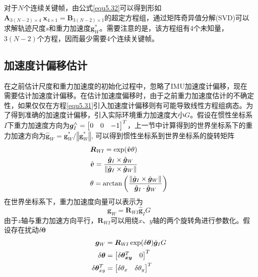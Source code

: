 对于$N$个连续关键帧，由公式\eqref{equ5.32}可以得到形如$\boldsymbol{A}_{3(N-2)\times4} \  \boldsymbol{x}_{4\times 1} = \boldsymbol{B}_{3(N-2)\times 1}$的超定方程组，通过矩阵奇异值分解(SVD)可以求解轨迹尺度$s$和重力加速度$\boldsymbol{g}_W^*$。需要注意的是，该方程组有4个未知量，$3(N-2)$个方程，因而最少需要4个连续关键帧。


\subsection{加速度计偏移估计}
在之前估计尺度和重力加速度的初始化过程中，忽略了IMU加速度计偏移，现在需要估计加速度计偏移。在估计加速度偏移时，由于之前重力加速度估计的不确定性，如果仅仅在方程\eqref{equ5.31}引入加速度计偏移则有可能导致线性方程组病态。为了得到准确的加速度计偏移，引入实际环境重力加速度大小$G$。假设在惯性坐标系$I$下重力加速度方向为$\boldsymbol{g}_I^{\wedge}= { \begin{bmatrix} 0 & 0 & -1 \cr  \end{bmatrix} ^T }$，上一节中计算得到的世界坐标系下的重力加速方向为$\hat{\boldsymbol{g}}_W = \boldsymbol{g}_W^* / \left\Vert \boldsymbol{g}_W^* \right\Vert$, 可以得到惯性坐标系到世界坐标系的旋转矩阵
\begin{equation}
\label{equ5.33}
\begin{aligned}
& \boldsymbol{R}_{W\!I} = \exp(\hat{\boldsymbol{v}} \theta)  \\ 
& \hat{\boldsymbol{v}} = { { \hat{\boldsymbol{g}}_I \times \hat{\boldsymbol{g}}_W } \over { \left\Vert \hat{\boldsymbol{g}}_I \times \hat{\boldsymbol{g}}_W   \right\Vert } }\\ 
& \theta = \arctan\left( {\left\Vert \hat{\boldsymbol{g}}_I \times \hat{\boldsymbol{g}}_W   \right\Vert \over \hat{\boldsymbol{g}}_I \cdot \hat{\boldsymbol{g}}_W }\right)
\end{aligned}
\end{equation}
在世界坐标系下，重力加速度向量可以表示为
\begin{equation}
\label{equ5.34}
\boldsymbol{g}_W = \boldsymbol{R}_{W\!I}\hat{\boldsymbol{g}}_IG
\end{equation}
由于$z$轴与重力加速方向平行，$\boldsymbol{R}_{W\!I}$可以用绕$x$、$y$轴的两个旋转角进行参数化。假设存在扰动$\delta \boldsymbol{\theta}$
\begin{equation}
\label{equ5.35}
\begin{aligned}
\boldsymbol{g}_W & = \boldsymbol{R}_{W\!I} \exp (\delta \boldsymbol{\theta}) \hat{\boldsymbol{g}}_I G 
\\ 
\delta \boldsymbol{\theta} &=
\begin{bmatrix}
\delta \boldsymbol{\theta_{xy}}^T & 0 \cr
\end{bmatrix}^T
\\
\delta \boldsymbol{\theta}_{xy}^T &= 
\begin{bmatrix}
\delta \theta_x & \delta \theta_y \cr
\end{bmatrix}^T
\end{aligned}
\end{equation}
